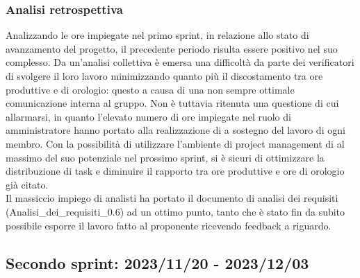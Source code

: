 \newpage
\subsubsection{Analisi retrospettiva}
Analizzando le ore impiegate nel primo sprint, in relazione allo stato di avanzamento del progetto, il precedente periodo risulta essere positivo nel suo complesso. Da un'analisi collettiva è emersa una difficoltà da parte dei verificatori di svolgere il loro lavoro minimizzando quanto più il discostamento tra ore produttive e di orologio: questo a causa di una non sempre ottimale comunicazione interna al gruppo. Non è tuttavia ritenuta una questione di cui allarmarsi, in quanto l'elevato numero di ore impiegate nel ruolo di amministratore hanno portato alla realizzazione di  a sostegno del lavoro di ogni membro. Con la possibilità di utilizzare l'ambiente di project management di  al massimo del suo potenziale nel prossimo sprint, si è sicuri di ottimizzare la distribuzione di task e diminuire il rapporto tra ore produttive e ore di orologio già citato.\\
Il massiccio impiego di analisti ha portato il documento di analisi dei requisiti (Analisi\_dei\_requisiti\_0.6) ad un ottimo punto, tanto che è stato fin da subito possibile esporre il lavoro fatto al proponente ricevendo feedback a riguardo.
\newpage

\subsection{Secondo sprint: 2023/11/20 - 2023/12/03}

